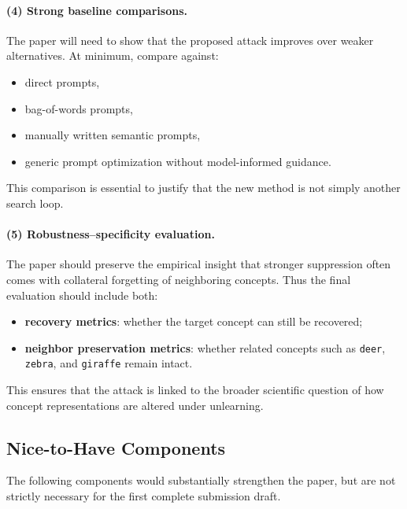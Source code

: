 \paragraph{(4) Strong baseline comparisons.}
The paper will need to show that the proposed attack improves over weaker alternatives. At minimum, compare against:
\begin{itemize}
    \item direct prompts,
    \item bag-of-words prompts,
    \item manually written semantic prompts,
    \item generic prompt optimization without model-informed guidance.
\end{itemize}
This comparison is essential to justify that the new method is not simply another search loop.

\paragraph{(5) Robustness--specificity evaluation.}
The paper should preserve the empirical insight that stronger suppression often comes with collateral forgetting of neighboring concepts. Thus the final evaluation should include both:
\begin{itemize}
    \item \textbf{recovery metrics}: whether the target concept can still be recovered;
    \item \textbf{neighbor preservation metrics}: whether related concepts such as \texttt{deer}, \texttt{zebra}, and \texttt{giraffe} remain intact.
\end{itemize}
This ensures that the attack is linked to the broader scientific question of how concept representations are altered under unlearning.

\subsection{Nice-to-Have Components}
\label{subsubsec:nice_to_have_components}

The following components would substantially strengthen the paper, but are not strictly necessary for the first complete submission draft.

